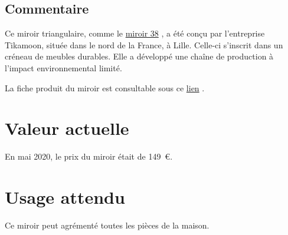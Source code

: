       \subsection* {Commentaire}
       
    
Ce miroir triangulaire, comme le 
    \href{miroir38.xml}{miroir
                    38}
  , a été conçu par l’entreprise Tikamoon, située dans le nord de
                la France, à Lille. Celle-ci s’inscrit dans un créneau de meubles durables. Elle a
                développé une chaîne de production à l’impact environnemental limité. 
    
 
    
La fiche produit du miroir est consultable sous ce  
    \href{https://www.tikamoon.com/art-miroir-triangulaire-en-m-tal-60-maho-2782.htm}{lien}
  . 
    

      \section* {Valeur actuelle} En mai 2020, le prix du miroir était de 149 €.
      \section* {Usage attendu}  
    
Ce miroir peut agrémenté toutes les pièces de la maison. 
    

    
  